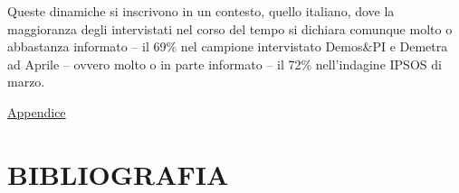 \documentclass[
]{book}
\begin{document}
Queste dinamiche si inscrivono in un contesto, quello italiano, dove la maggioranza degli intervistati nel corso del tempo si dichiara comunque molto o abbastanza informato -- il 69\% nel campione intervistato Demos\&PI e Demetra ad Aprile -- ovvero molto o in parte informato -- il 72\% nell'indagine IPSOS di marzo.

\href{https://github.com/LucianaFazio/Ucrania/blob/main/VIII.\%20Ruolo\%20dei\%20media.pdf}{Appendice}

\hypertarget{bibliografia}{%
\chapter*{BIBLIOGRAFIA}\label{bibliografia}}

  
\end{document}
